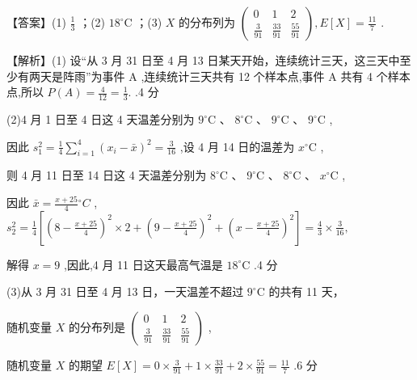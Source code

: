 \documentclass[10pt]{article}
\begin{document}
【答案】(1) \(\frac{1}{3}\) ；(2) \({18}^{ \circ  }\mathrm{C}\) ；(3) \(X\) 的分布列为 \(\left( \begin{matrix} 0 & 1 & 2 \\  \frac{3}{91} & \frac{33}{91} & \frac{55}{91} \end{matrix}\right) ,E\left\lbrack  X\right\rbrack   = \frac{11}{7}\) .

【解析】(1) 设“从 3 月 31 日至 4 月 13 日某天开始，连续统计三天，这三天中至少有两天是阵雨”为事件 \(\mathrm{A}\) ,连续统计三天共有 12 个样本点,事件 \(\mathrm{A}\) 共有 4 个样本点,所以 \(P\left( A\right)  = \frac{4}{12} = \frac{1}{3}.\) .4 分

(2)4 月 1 日至 4 日这 4 天温差分别为 \({9}^{ \circ  }\mathrm{C}\text{ 、 }{8}^{ \circ  }\mathrm{C}\text{ 、 }{9}^{ \circ  }\mathrm{C}\text{ 、 }{9}^{ \circ  }\mathrm{C}\) ,

因此 \({s}_{1}^{2} = \frac{1}{4}\mathop{\sum }\limits_{{i = 1}}^{4}{\left( {x}_{i} - \bar{x}\right) }^{2} = \frac{3}{16}\) ,设 4 月 14 日的温差为 \({x}^{ \circ  }\mathrm{C}\) ,

则 4 月 11 日至 14 日这 4 天温差分别为 \({8}^{ \circ  }\mathrm{C}\text{ 、 }{9}^{ \circ  }\mathrm{C}\text{ 、 }{8}^{ \circ  }\mathrm{C}\text{ 、 }{x}^{ \circ  }\mathrm{C}\) ,

因此 \(\bar{x} = \frac{x + {25}}{4}{}^{ \circ  }C\) , \({s}_{2}^{2} = \frac{1}{4}\left\lbrack  {{\left( 8 - \frac{x + {25}}{4}\right) }^{2} \times  2 + {\left( 9 - \frac{x + {25}}{4}\right) }^{2} + {\left( x - \frac{x + {25}}{4}\right) }^{2}}\right\rbrack   = \frac{4}{3} \times  \frac{3}{16},\)

解得 \(x = 9\) ,因此,4 月 11 日这天最高气温是 \({18}^{ \circ  }\mathrm{C}\) .4 分

(3)从 3 月 31 日至 4 月 13 日，一天温差不超过 \({9}^{ \circ  }\mathrm{C}\) 的共有 11 天，

随机变量 \(X\) 的分布列是 \(\left( \begin{matrix} 0 & 1 & 2 \\  \frac{3}{91} & \frac{33}{91} & \frac{55}{91} \end{matrix}\right)\) ,

随机变量 \(X\) 的期望 \(E\left\lbrack  X\right\rbrack   = 0 \times  \frac{3}{91} + 1 \times  \frac{33}{91} + 2 \times  \frac{55}{91} = \frac{11}{7}\) .6 分
\end{document}

